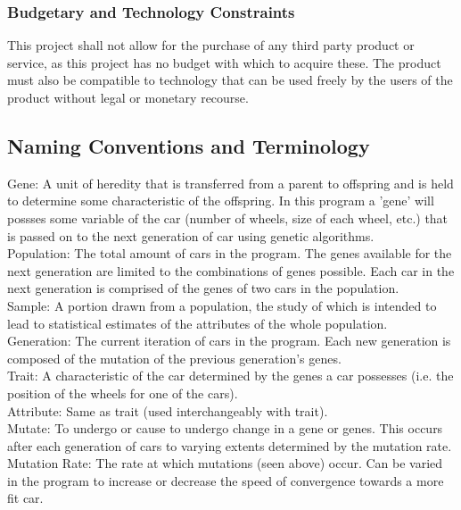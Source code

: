 \documentclass[12pt, titlepage]{article}
\begin{document}
\subsubsection{Budgetary and Technology Constraints}
This project shall not allow for the purchase of any third party product or 
service, as this project has no budget with which to acquire these. The product 
must also be compatible to technology that can be used freely by the users of 
the product without legal or monetary recourse.

\subsection{Naming Conventions and Terminology}

Gene: A unit of heredity that is transferred from a parent to offspring and is 
held to determine some characteristic of the offspring. In this program a 'gene' will possses some variable of the car (number of wheels, size of each wheel, etc.) that is passed on to the next generation of car using genetic algorithms.\\

Population: The total amount of cars in the program. The genes available for the next generation are limited to the combinations of genes possible. Each car in the next generation is comprised of the genes of two cars in the population.\\

Sample: A portion drawn from a population, the study of which is intended to 
lead to statistical estimates of the attributes of the whole population.\\

Generation: The current iteration of cars in the program. Each new generation is composed of the mutation of the previous generation's genes.\\

Trait: A characteristic of the car determined by the genes a car possesses (i.e. the position of the wheels 
for one of the cars).\\

Attribute: Same as trait (used interchangeably with trait).\\

Mutate: To undergo or cause to undergo change in a gene or genes. This occurs after each generation of cars to varying extents determined by the mutation rate.\\

Mutation Rate: The rate at which mutations (seen above) occur. Can be varied in the program to increase or decrease the speed of convergence towards a more fit car.\\
\end{document}
